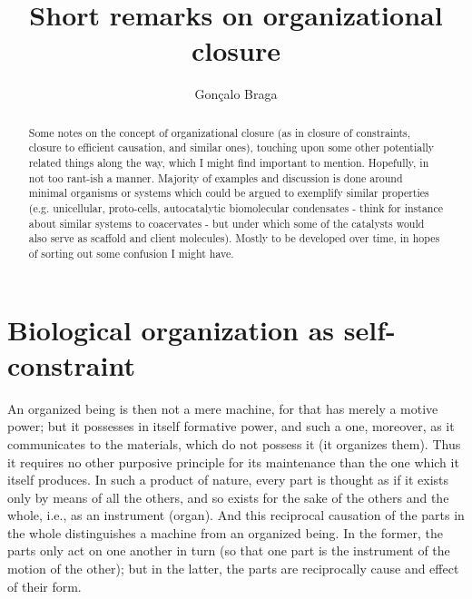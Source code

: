 \documentclass[a4paper,12pt,twoside,leqno]{article}
\title{\textbf{Short remarks on organizational closure}}
\author{Gonçalo Braga}
\begin{document}
\maketitle


\begin{abstract}Some notes on the concept of organizational closure (as in closure of constraints, closure to efficient causation, and similar ones), touching upon some other potentially related things along the way, which I might find important to mention. Hopefully, in not too rant-ish a manner. Majority of examples and discussion is done around minimal organisms or systems which could be argued to exemplify similar properties (e.g. unicellular, proto-cells, autocatalytic biomolecular condensates - think for instance about similar systems to coacervates - but under which some of the catalysts would also serve as scaffold and client molecules). Mostly to be developed over time, in hopes of sorting out some confusion I might have.
\end{abstract}


\paragraph*{}


\section{Biological organization as self-constraint}

\epigraph{An organized being is then not a mere machine, for that has merely a motive power; but it possesses in itself formative power, and such a one, moreover, as it communicates to the materials, which do not possess it (it organizes them). Thus it requires no other purposive principle for its maintenance than the one which it itself produces. In such a product of nature, every part is thought as if it exists only by means of all the others, and so exists for the sake of the others and the whole, i.e., as an instrument (organ). And this reciprocal causation of the parts in the whole distinguishes a machine from an organized being. In the former, the parts only act on one another in turn (so that one part is the instrument of the motion of the other); but in the latter, the parts are reciprocally cause and effect of their form.}{\cite{Kant1790-KANCOJ-2}}
\end{document}
